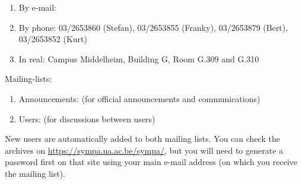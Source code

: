 \begin{enumerate}
\item  By e-mail:  \hpcinfo
\item  By phone: 03/2653860 (Stefan), 03/2653855 (Franky), 03/2653879 (Bert), 03/2653852 (Kurt)
\item  In real: Campus Middelheim, Building G, Room G.309 and G.310
\end{enumerate}

Mailing-lists:

\begin{enumerate}
\item  Announcements: \hpcannounceml (for official announcements and communications)
\item  Users: \hpcusersml (for discussions between users)
\end{enumerate}

New users are automatically added to both mailing lists.
You can check the archives on \url{https://sympa.ua.ac.be/sympa/}, but you will need to
generate a password first on that site using your main e-mail address (on which you
receive the mailing list).
